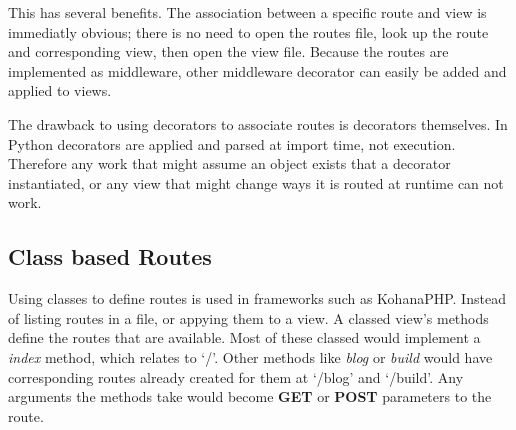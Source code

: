 This has several benefits. The association between a specific route and
view is immediatly obvious; there is no need to open the routes file,
look up the route and corresponding view, then open the view file.
Because the routes are implemented as middleware, other middleware
decorator can easily be added and applied to views.

The drawback to using decorators to associate routes is decorators
themselves. In Python decorators are applied and parsed at import time,
not execution. Therefore any work that might assume an object exists
that a decorator instantiated, or any view that might change ways it is
routed at runtime can not work.

\subsection{Class based Routes}

Using classes to define routes is used in frameworks such as KohanaPHP.
Instead of listing routes in a file, or appying them to a view. A
classed view's methods define the routes that are available. Most of
these classed would implement a \emph{index} method, which relates to
`/'. Other methods like \emph{blog} or \emph{build} would have
corresponding routes already created for them at `/blog' and `/build'.
Any arguments the methods take would become \textbf{GET} or
\textbf{POST} parameters to the route.
